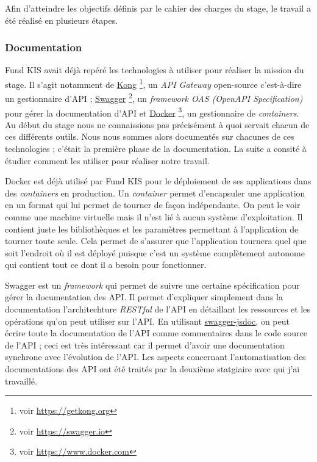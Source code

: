 Afin d'atteindre les objectifs définis par le cahier des charges du stage, le travail a été réalisé en plusieurs étapes.

\subsubsection{Documentation}
Fund KIS avait déjà repéré les technologies à utiliser pour réaliser la mission du stage. Il s'agit notamment de \href{https://getkong.org}{Kong} \footnote{voir \url{https://getkong.org}}, un \textit{API Gateway} open-source c'est-à-dire un gestionnaire d'API ; \href{https://swagger.io}{Swagger} \footnote{voir \url{https://swagger.io}}, un \textit{framework OAS (OpenAPI Specification)} pour gérer la documentation d'API et \href{https://www.docker.com}{Docker} \footnote{voir \url{https://www.docker.com}}, un gestionnaire de \textit{containers}. Au début du stage nous ne connaissions pas précisément à quoi servait chacun de ces différents outils. Nous nous sommes alors documentés sur chacunes de ces technologies ; c'était la première phase de la documentation. La suite a consité à étudier comment les utiliser pour réaliser notre travail.

\vspace{3mm}

Docker est déjà utilisé par Fund KIS pour le déploiement de ses applications dans des \textit{containers} en production. Un \textit{container} permet d'encapsuler une application en un format qui lui permet de tourner de façon indépendante. On peut le voir comme une machine virtuelle mais il n'est lié à aucun système d'exploitation. Il contient juste les bibliothèques et les paramètres permettant à l'application de tourner toute seule. Cela permet de s'assurer que l'application tournera quel que soit l'endroit où il est déployé puisque c'est un système complètement autonome qui contient tout ce dont il a besoin pour fonctionner.


\vspace{3mm}
Swagger est un \textit{framework} qui permet de suivre une certaine spécification pour gérer la documentation des API. Il permet d'expliquer simplement dans la documentation l'architechture \textit{RESTful} de l'API en détaillant les ressources et les opérations qu'on peut utiliser sur l'API. En utilisant \href{https://github.com/Surnet/swagger-jsdoc}{swagger-jsdoc}, on peut écrire toute la documentation de l'API comme commentaires dans le code source de l'API ; ceci est très intéressant car il permet d'avoir une documentation synchrone avec l'évolution de l'API. Les aspects concernant l'automatisation des documentations des API ont été traités par la deuxième statgiaire avec qui j'ai travaillé.


